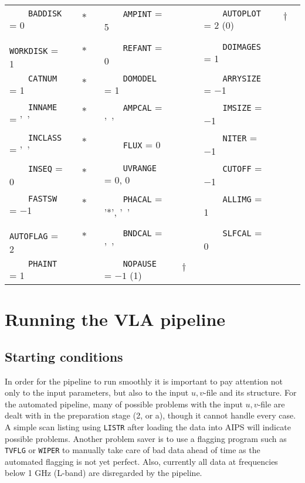 {\tablestyle
\begin{table*}[h]
\begin{tabular}{lc|lc|lc}
$\phantom{0000}${\tt BADDISK} = 0   & $\ast$$\phantom{0000}$ & $\phantom{0000}${\tt AMPINT} = 5         &  & $\phantom{0000}${\tt AUTOPLOT} = 2 (0) & $\dagger$$\phantom{0000}$\\
$\phantom{0000}${\tt WORKDISK} = 1  & $\ast$$\phantom{0000}$ & $\phantom{0000}${\tt REFANT} = 0         &  & $\phantom{0000}${\tt DOIMAGES} = 1     & \\
$\phantom{0000}${\tt CATNUM} = 1    & $\ast$$\phantom{0000}$ & $\phantom{0000}${\tt DOMODEL} = 1        &  & $\phantom{0000}${\tt ARRYSIZE} = $-$1  & \\
$\phantom{0000}${\tt INNAME} = '\ ' & $\ast$$\phantom{0000}$ & $\phantom{0000}${\tt AMPCAL} = '\ '      &  & $\phantom{0000}${\tt IMSIZE} = $-$1    & \\
$\phantom{0000}${\tt INCLASS} = '\ '& $\ast$$\phantom{0000}$ & $\phantom{0000}${\tt FLUX} = 0           &  & $\phantom{0000}${\tt NITER} = $-$1     & \\
$\phantom{0000}${\tt INSEQ} = 0     & $\ast$$\phantom{0000}$ & $\phantom{0000}${\tt UVRANGE} = 0, 0     &  & $\phantom{0000}${\tt CUTOFF} = $-$1    & \\
$\phantom{0000}${\tt FASTSW} = $-$1 & $\ast$$\phantom{0000}$ & $\phantom{0000}${\tt PHACAL} = '*', '\ ' &  & $\phantom{0000}${\tt ALLIMG} = 1       & \\
$\phantom{0000}${\tt AUTOFLAG} = 2  & $\ast$$\phantom{0000}$ & $\phantom{0000}${\tt BNDCAL} = '\ '      &  & $\phantom{0000}${\tt SLFCAL} = 0       & \\
$\phantom{0000}${\tt PHAINT} = 1    &                           & $\phantom{0000}${\tt NOPAUSE} = $-1$ (1) & $\dagger$$\phantom{0000}$ &            & \\

\end{tabular}
\end{table*}

}

\section{Running the VLA pipeline}
\subsection{Starting conditions}
In order for the pipeline to run smoothly it is important to pay
attention not only to the input parameters, but also to the input $u,v$-file
and its structure. For the automated pipeline, many of possible
problems with the input $u,v$-file are dealt with in the preparation
stage (2, or a), though it cannot handle every case. A simple scan
listing using {\tt LISTR} after loading the data into AIPS will
indicate possible problems. Another problem saver is to use a flagging
program such as {\tt TVFLG} or {\tt WIPER} to manually take care of
bad data ahead of time as the automated flagging is not yet
perfect. Also, currently all data at frequencies below 1 GHz (L-band)
are disregarded by the pipeline.

